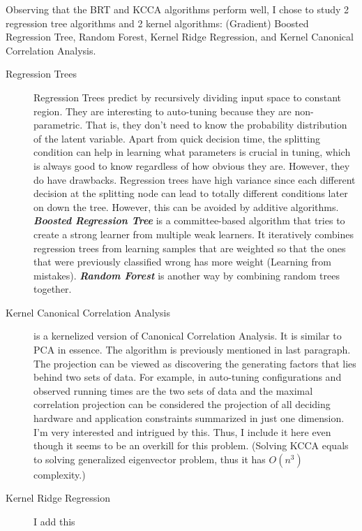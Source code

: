 Observing that the BRT and KCCA algorithms perform well, I chose to study 2 regression tree algorithms and 2 kernel algorithms: (Gradient) Boosted Regression Tree, Random Forest, Kernel Ridge Regression, and Kernel Canonical Correlation Analysis.
\begin{description}
\item[Regression Trees] Regression Trees predict by recursively dividing input space to constant region. They are interesting to auto-tuning because they are non-parametric. That is, they don't need to know the probability distribution of the latent variable. Apart from quick decision time, the splitting condition can help in learning what parameters is crucial in tuning, which is always good to know regardless of how obvious they are. However, they do have drawbacks. Regression trees have high variance since each different decision at the splitting node can lead to totally different conditions later on down the tree. However, this can be avoided by additive algorithms. \textbf{\emph{Boosted Regression Tree}} is a committee-based algorithm that tries to create a strong learner from multiple weak learners. It iteratively combines regression trees from learning samples that are weighted so that the ones that were previously classified wrong has more weight (Learning from mistakes). \textbf{\emph{Random Forest}} is another way by combining random trees together.
\item[Kernel Canonical Correlation Analysis] is a kernelized version of Canonical Correlation Analysis.\cite{KICA} It is similar to PCA in essence. The algorithm is previously mentioned in last paragraph. The projection can be viewed as discovering the generating factors that lies behind two sets of data. For example, in auto-tuning configurations and observed running times are the two sets of data and the maximal correlation projection can be considered the projection of all deciding hardware and application constraints summarized in just one dimension. I'm very interested and intrigued by this. Thus, I include it here even though it seems to be an overkill for this problem. (Solving KCCA equals to solving generalized eigenvector problem, thus it has $O(n^3)$ complexity.)
\item[Kernel Ridge Regression] I add this
\end{description}



